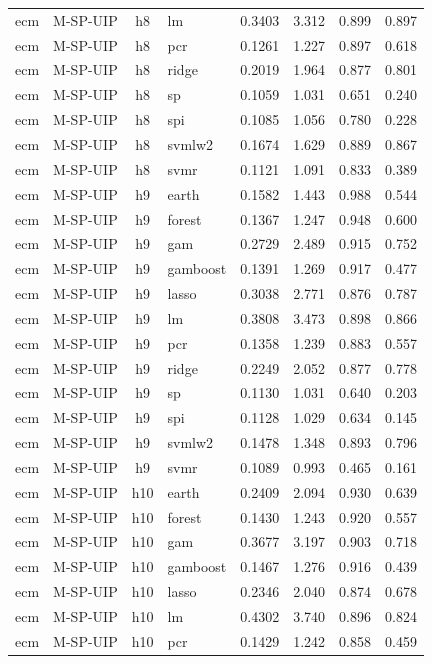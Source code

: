 \begin{ThreePartTable}
\begin{longtable}[t]{llclcccc}
ecm & M-SP-UIP & h8 & lm & 0.3403 & 3.312 & 0.899 & 0.897\\
ecm & M-SP-UIP & h8 & pcr & 0.1261 & 1.227 & 0.897 & 0.618\\
ecm & M-SP-UIP & h8 & ridge & 0.2019 & 1.964 & 0.877 & 0.801\\
ecm & M-SP-UIP & h8 & sp & 0.1059 & 1.031 & 0.651 & 0.240\\
ecm & M-SP-UIP & h8 & spi & 0.1085 & 1.056 & 0.780 & 0.228\\
ecm & M-SP-UIP & h8 & svmlw2 & 0.1674 & 1.629 & 0.889 & 0.867\\
ecm & M-SP-UIP & h8 & svmr & 0.1121 & 1.091 & 0.833 & 0.389\\
\addlinespace
ecm & M-SP-UIP & h9 & earth & 0.1582 & 1.443 & 0.988 & 0.544\\
ecm & M-SP-UIP & h9 & forest & 0.1367 & 1.247 & 0.948 & 0.600\\
ecm & M-SP-UIP & h9 & gam & 0.2729 & 2.489 & 0.915 & 0.752\\
ecm & M-SP-UIP & h9 & gamboost & 0.1391 & 1.269 & 0.917 & 0.477\\
ecm & M-SP-UIP & h9 & lasso & 0.3038 & 2.771 & 0.876 & 0.787\\
ecm & M-SP-UIP & h9 & lm & 0.3808 & 3.473 & 0.898 & 0.866\\
ecm & M-SP-UIP & h9 & pcr & 0.1358 & 1.239 & 0.883 & 0.557\\
ecm & M-SP-UIP & h9 & ridge & 0.2249 & 2.052 & 0.877 & 0.778\\
ecm & M-SP-UIP & h9 & sp & 0.1130 & 1.031 & 0.640 & 0.203\\
ecm & M-SP-UIP & h9 & spi & 0.1128 & 1.029 & 0.634 & 0.145\\
ecm & M-SP-UIP & h9 & svmlw2 & 0.1478 & 1.348 & 0.893 & 0.796\\
ecm & M-SP-UIP & h9 & svmr & 0.1089 & 0.993 & 0.465 & 0.161\\
\addlinespace
ecm & M-SP-UIP & h10 & earth & 0.2409 & 2.094 & 0.930 & 0.639\\
ecm & M-SP-UIP & h10 & forest & 0.1430 & 1.243 & 0.920 & 0.557\\
ecm & M-SP-UIP & h10 & gam & 0.3677 & 3.197 & 0.903 & 0.718\\
ecm & M-SP-UIP & h10 & gamboost & 0.1467 & 1.276 & 0.916 & 0.439\\
ecm & M-SP-UIP & h10 & lasso & 0.2346 & 2.040 & 0.874 & 0.678\\
ecm & M-SP-UIP & h10 & lm & 0.4302 & 3.740 & 0.896 & 0.824\\
ecm & M-SP-UIP & h10 & pcr & 0.1429 & 1.242 & 0.858 & 0.459\\

\end{longtable}
\end{ThreePartTable}
